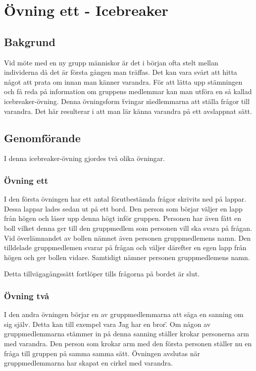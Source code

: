 \section{Övning ett - Icebreaker}


\subsection{Bakgrund}
Vid möte med en ny grupp människor är det i början ofta stelt mellan individerna då det är första gången man träffas. Det kan vara svårt att hitta något att prata om innan man känner varandra. För att lätta upp stämningen och få reda på information om gruppens medlemmar kan man utföra en så kallad icebreaker-övning. Denna övningsform \" tvingar \" medlemmarna att ställa frågor till varandra. Det här resulterar i att man lär känna varandra på ett avslappnat sätt. \cite{icebreaker}


\subsection{Genomförande}
I denna icebreaker-övning gjordes två olika övningar.

\subsubsection{Övning ett}
I den första övningen har ett antal förutbestämda frågor skrivits ned på lappar. Dessa lappar lades sedan ut på ett bord. Den person som börjar väljer en lapp från högen och läser upp denna högt inför gruppen. Personen har även fått en boll vilket denna ger till den gruppmedlem som personen vill ska svara på frågan. Vid överlämnandet av bollen nämnet även personen gruppmedlemens namn. Den tilldelade gruppmedlemen svarar på frågan och väljer därefter en egen lapp från högen och ger bollen vidare. Samtidigt nämner personen gruppmedlemens namn.


\bigskip

Detta tillvägagångssätt fortlöper tills frågorna på bordet är slut.

\subsubsection{Övning två}
I den andra övningen börjar en av gruppmedlemmarna att säga en sanning om sig själv. Detta kan till exempel vara \"Jag har en bror\". Om någon av gruppmedlemmarna stämmer in på denna sanning ställer krokar personerna arm med varandra. Den person som krokar arm med den första personen ställer nu en fråga till gruppen på samma samma sätt. Övningen avslutas när gruppmedlemmarna har skapat en cirkel med varandra.


